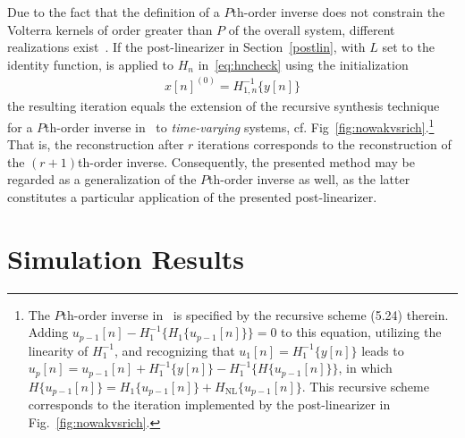 \documentclass[10pt,twocolumn,twoside]{IEEEtran}
\begin{document}
Due to the fact that the definition of a $P$th-order inverse does
not constrain the Volterra kernels of order greater than $P$ of the
overall system, different realizations exist~\cite{schetzen1976,sarti1992,kafka2002}.
If the post-linearizer in Section~\ref{postlin}, with $L$ set to the identity
function, is applied to $H_n$ in~\eqref{eq:hncheck} using the initialization
\begin{align}
	x[n]^{(0)} = H^{-1}_{1,n}\{y[n]\}
	\label{eq:poiequiinit}
\end{align}
the resulting iteration equals the extension of the recursive synthesis technique for a
$P$th-order inverse in~\cite[ch.~5.2.3]{kafka2002} to \emph{time-varying} systems,
cf. Fig~\ref{fig:nowakvsrich}.\footnote{The $P$th-order inverse
in~\cite{kafka2002} is specified by the recursive scheme (5.24) therein. Adding
$u_{p-1}[n] - H_1^{-1}\{ H_1\{ u_{p-1}[n] \} \} = 0$ to this equation, utilizing the
linearity of $H_1^{-1}$, and recognizing that $u_1[n] = H_1^{-1}\{y[n]\}$ leads to
$u_p[n] = u_{p-1}[n] + H_1^{-1}\{y[n]\} - H_1^{-1}\{ H\{ u_{p-1}[n] \} \}$,
in which $H\{ u_{p-1}[n] \} = H_1\{ u_{p-1}[n]\} + H_\text{NL}\{ u_{p-1}[n] \}$. This
recursive scheme corresponds to the iteration implemented by the post-linearizer in
Fig.~\ref{fig:nowakvsrich}.}
That is, the reconstruction after $r$ iterations corresponds to the reconstruction
of the ${(r+1)}$th-order inverse. Consequently, the
presented method may be regarded as a generalization of the $P$th-order inverse
as well, as the latter constitutes a particular application of the presented post-linearizer.


\section{Simulation Results}
	\label{results}
\end{document}

